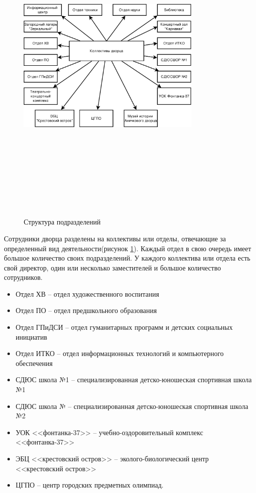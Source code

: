 \documentclass[utf8,usehyperref,12pt]{G7-32}
\begin{document}
\begin{figure}[ht]
   \centering%
   \includegraphics[height=160mm, width=0.8\textwidth, clip, keepaspectratio]{pictures/org_struct}
   \caption{Структура подразделений}\label{fig:org_structure}
 \end{figure}

Сотрудники дворца разделены на коллективы или отделы, отвечающие за определенный вид деятельности(рисунок \ref{fig:org_structure}).
Каждый отдел в свою очередь имеет большое количество своих подразделений. У каждого коллектива или отдела есть свой директор, один или несколько заместителей и большое количество сотрудников.

\begin{itemize}
\item Отдел ХВ – отдел художественного воспитания
\item Отдел ПО – отдел предшкольного  образования
\item Отдел ГПиДСИ – отдел гуманитарных программ и детских социальных инициатив
\item Отдел ИТКО – отдел информационных технологий и компьютерного обеспечения
\item СДЮС школа №1 – специализированная детско-юношеская спортивная школа №1
\item СДЮС школа № – специализированная детско-юношеская спортивная школа №2
\item УОК <<фонтанка-37>> – учебно-оздоровительный комплекс <<фонтанка-37>>
\item ЭБЦ <<крестовский остров>> – эколого-биологический центр <<крестовский остров>>
\item ЦГПО – центр городских предметных олимпиад.
\end{itemize}
\end{document}
